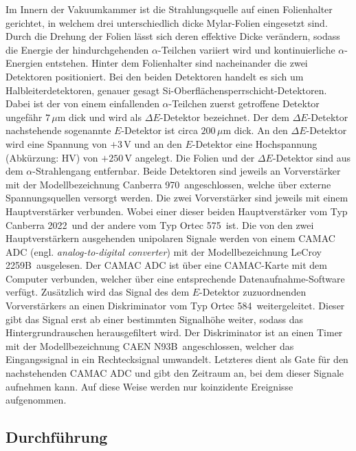 Im Innern der Vakuumkammer ist die Strahlungsquelle auf einen Folienhalter gerichtet, in welchem drei unterschiedlich dicke Mylar-Folien eingesetzt sind.
Durch die Drehung der Folien lässt sich deren effektive Dicke verändern, sodass die Energie der hindurchgehenden $\alpha$-Teilchen variiert wird und kontinuierliche $\alpha$-Energien entstehen.
Hinter dem Folienhalter sind nacheinander die zwei Detektoren positioniert.
Bei den beiden Detektoren handelt es sich um Halbleiterdetektoren, genauer gesagt Si-Oberflächensperrschicht-Detektoren.
Dabei ist der von einem einfallenden $\alpha$-Teilchen zuerst getroffene Detektor ungefähr $7\,\mu$m dick und wird als $\Delta E$-Detektor bezeichnet.
Der dem $\Delta E$-Detektor nachstehende sogenannte $E$-Detektor ist circa $200\,\mu$m dick.
An den $\Delta E$-Detektor wird eine Spannung von $+3\,$V und an den $E$-Detektor eine Hochspannung (Abkürzung: HV) von $+250\,$V angelegt.
Die Folien und der $\Delta E$-Detektor sind aus dem $\alpha$-Strahlengang entfernbar.
Beide Detektoren sind jeweils an Vorverstärker mit der Modellbezeichnung \glqq Canberra 970\grqq\ angeschlossen, welche über externe Spannungsquellen versorgt werden.
Die zwei Vorverstärker sind jeweils mit einem Hauptverstärker verbunden.
Wobei einer dieser beiden Hauptverstärker vom Typ \glqq Canberra 2022\grqq\ und der andere vom Typ \glqq Ortec 575\grqq\ ist.
Die von den zwei Hauptverstärkern ausgehenden unipolaren Signale werden von einem CAMAC ADC (engl. \emph{analog-to-digital converter}) mit der Modellbezeichnung \glqq LeCroy 2259B\grqq\ ausgelesen.
Der CAMAC ADC ist über eine CAMAC-Karte mit dem Computer verbunden, welcher über eine entsprechende Datenaufnahme-Software verfügt.
Zusätzlich wird das Signal des dem $E$-Detektor zuzuordnenden Vorverstärkers an einen Diskriminator vom Typ \glqq Ortec 584\grqq\ weitergeleitet.
Dieser gibt das Signal erst ab einer bestimmten Signalhöhe weiter, sodass das Hintergrundrauschen herausgefiltert wird.
Der Diskriminator ist an einen Timer mit der Modellbezeichnung \glqq CAEN N93B\grqq\ angeschlossen, welcher das Eingangssignal in ein Rechtecksignal umwandelt.
Letzteres dient als Gate für den nachstehenden CAMAC ADC und gibt den Zeitraum an, bei dem dieser Signale aufnehmen kann.
Auf diese Weise werden nur koinzidente Ereignisse aufgenommen.



\subsection{Durchführung}

